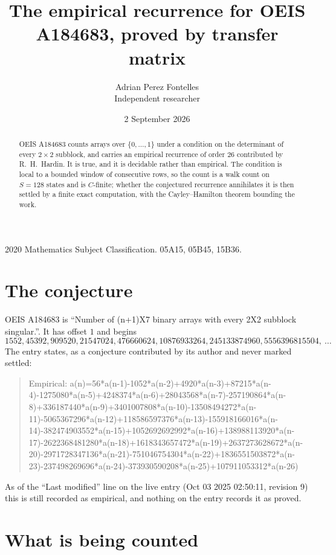 \documentclass[11pt,a4paper]{article}
\title{The empirical recurrence for OEIS A184683, proved by transfer matrix}
\author{Adrian Perez Fontelles\\ \small Independent researcher}
\date{2 September 2026}
\theoremstyle{plain}
\theoremstyle{definition}
\begin{document}
\maketitle

\begin{abstract}
OEIS A184683 counts arrays over $\{0,\dots,1\}$ under a condition on the determinant of every
$2\times2$ subblock, and carries an empirical recurrence of order $26$ contributed by
R.~H.~Hardin. It is true, and it is decidable rather than empirical. The condition is local to
a bounded window of consecutive rows, so the count is a walk count on $S=128$ states and is
$C$-finite; whether the conjectured recurrence annihilates it is then settled by a finite exact
computation, with the Cayley--Hamilton theorem bounding the work.
\end{abstract}

\noindent\small 2020 Mathematics Subject Classification. 05A15, 05B45, 15B36.\normalsize

\section{The conjecture}

OEIS A184683 is ``Number of (n+1)X7 binary arrays with every 2X2 subblock singular.''. It has offset $1$ and begins
\[
1552, 45392, 909520, 21547024, 476660624, 10876933264, 245133874960, 5556396815504,\ \dots
\]
The entry states, as a conjecture contributed by its author and never marked settled:
\begin{quote}
Empirical: a(n)=56*a(n-1)-1052*a(n-2)+4920*a(n-3)+87215*a(n-4)-1275080*a(n-5)+4248374*a(n-6)+28043568*a(n-7)-257190864*a(n-8)+336187440*a(n-9)+3401007808*a(n-10)-13508494272*a(n-11)-5065367296*a(n-12)+118586597376*a(n-13)-155918166016*a(n-14)-382474903552*a(n-15)+1052692692992*a(n-16)+138988113920*a(n-17)-2622368481280*a(n-18)+1618343657472*a(n-19)+2637273628672*a(n-20)-2971728347136*a(n-21)-751046754304*a(n-22)+1836551503872*a(n-23)-237498269696*a(n-24)-373930590208*a(n-25)+107911053312*a(n-26)
\end{quote}
As of the ``Last modified'' line on the live entry (Oct 03 2025 02:50:11, revision 9) this is still
recorded as empirical, and nothing on the entry records it as proved.

\section{What is being counted}
\end{document}
